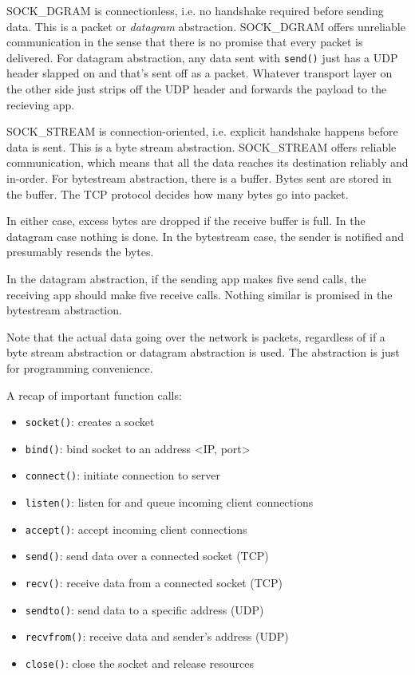 SOCK\_DGRAM is connectionless, i.e. no handshake required before sending data.
This is a packet or \emph{datagram} abstraction. SOCK\_DGRAM offers unreliable
communication in the sense that there is no promise that every packet is
delivered. For datagram abstraction, any data sent with
\texttt{send()} just has a UDP header slapped on and that's sent off as a packet.
Whatever transport layer on the other side just strips off the UDP header and
forwards the payload to the recieving app.

SOCK\_STREAM is connection-oriented, i.e. explicit handshake happens before
data is sent. This is a byte stream abstraction. SOCK\_STREAM offers reliable
communication, which means that all the data reaches its destination reliably and
in-order. For bytestream abstraction, there is a buffer. Bytes sent are stored
in the buffer. The TCP protocol decides how many bytes go into packet.

In either case, excess bytes are dropped if the receive buffer is full.
In the datagram case nothing is done. In the bytestream case, the sender
is notified and presumably resends the bytes.

In the datagram abstraction, if the sending app makes five send calls,
the receiving app should make five receive calls. Nothing similar is
promised in the bytestream abstraction.

Note that the actual data going over the network is packets, regardless of
if a byte stream abstraction or datagram abstraction is used. The abstraction
is just for programming convenience.

A recap of important function calls:

\begin{itemize}
    \item \texttt{socket()}: creates a socket
    \item \texttt{bind()}: bind socket to an address <IP, port>
    \item \texttt{connect()}: initiate connection to server
    \item \texttt{listen()}: listen for and queue incoming client connections
    \item \texttt{accept()}: accept incoming client connections
    \item \texttt{send()}: send data over a connected socket (TCP)
    \item \texttt{recv()}: receive data from a connected socket (TCP)
    \item \texttt{sendto()}: send data to a specific address (UDP)
    \item \texttt{recvfrom()}: receive data and sender's address (UDP)
    \item \texttt{close()}: close the socket and release resources
\end{itemize}

